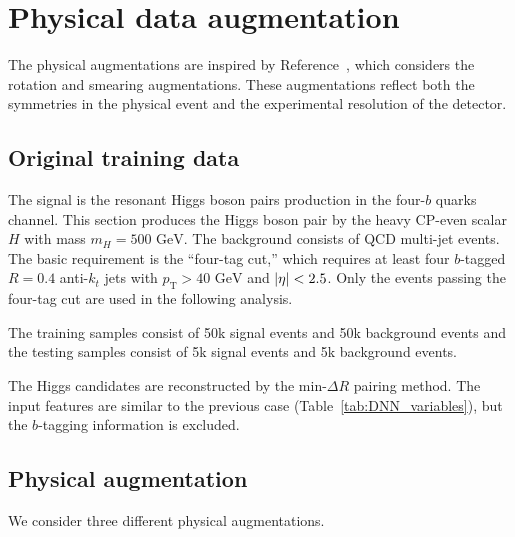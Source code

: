 \documentclass[12pt]{article}
\begin{document}
\section{Physical data augmentation}%
\label{sec:physical_data_augmentation}
    The physical augmentations are inspired by Reference~\cite{Dillon:2023zac}, which considers the rotation and smearing augmentations. These augmentations reflect both the symmetries in the physical event and the experimental resolution of the detector.
    \subsection{Original training data}%
    \label{sub:original_training_data}
        The signal is the resonant Higgs boson pairs production in the four-$b$ quarks channel. This section produces the Higgs boson pair by the heavy CP-even scalar $H$ with mass $m_H = \text{500 GeV}$. The background consists of QCD multi-jet events. The basic requirement is the ``four-tag cut,'' which requires at least four $b$-tagged $R = 0.4$ anti-$k_t$ jets with $p_\text{T} > \text{40 GeV}$ and $\abs{\eta} < 2.5$. Only the events passing the four-tag cut are used in the following analysis.
        
        The training samples consist of 50k signal events and 50k background events and the testing samples consist of 5k signal events and 5k background events.

        The Higgs candidates are reconstructed by the $\text{min-}\Delta R$ pairing method. The input features are similar to the previous case (Table~\ref{tab:DNN_variables}), but the $b$-tagging information is excluded.
    \subsection{Physical augmentation}%
    \label{sub:physical_augmentation}
        We consider three different physical augmentations.
\end{document}
